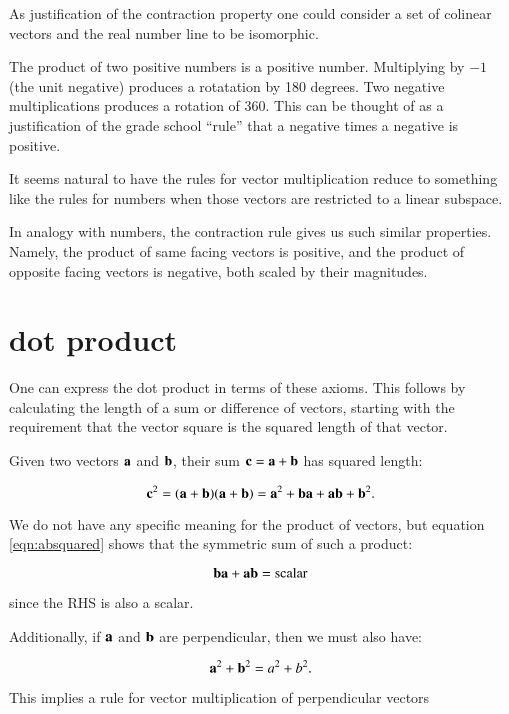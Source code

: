 \documentclass{article}      %
\begin{document}
As justification of the contraction property one could 
consider a set of colinear vectors and the real number line to be
isomorphic.

The product of two positive numbers is a positive number.  Multiplying
by $-1$ (the unit negative) produces a rotatation by 180 degrees.  Two negative multiplications
produces a rotation of 360.  This can be thought of as a justification
of the grade school ``rule'' that a negative times a negative is positive.

It seems natural to have the rules for vector multiplication reduce to something
like the rules for numbers when those vectors are restricted to a linear subspace.

In analogy with numbers, the contraction rule gives us such similar properties.  Namely, the
product of same facing vectors is positive, and the product of opposite facing
vectors is negative, both scaled by their magnitudes.

\section{ dot product }

One can express the dot product in terms of these axioms.  This follows by calculating the 
length of a sum or difference of vectors, starting with the requirement that the vector square is the squared length of that vector.

Given two vectors $\mathbf{a}$ and $\mathbf{b}$, their sum
$\mathbf{c} = \mathbf{a} + \mathbf{b}$ has squared length:

\begin{equation}\label{eqn:absquared}
\mathbf{c}^2 = (\mathbf{a} + \mathbf{b})(\mathbf{a} + \mathbf{b}) = \mathbf{a}^2 + \mathbf{b}\mathbf{a} + \mathbf{a}\mathbf{b} + \mathbf{b}^2.
\end{equation}

We do not have any specific meaning for the product of vectors, but equation \ref{eqn:absquared}
shows that the symmetric sum of such a product:

\begin{equation}
\mathbf{b}\mathbf{a} + \mathbf{a}\mathbf{b} = \text{scalar}
\end{equation}

since the RHS is also a scalar.

Additionally, if $\mathbf{a}$ and $\mathbf{b}$ are perpendicular, then we must also have:

\[
\mathbf{a}^2 + \mathbf{b}^2 = a^2 + b^2.
\]

This implies a rule for vector multiplication of perpendicular vectors
\end{document}
